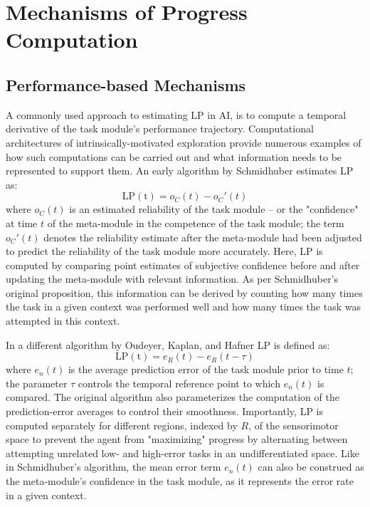 \section{Mechanisms of Progress Computation}

\subsection{Performance-based Mechanisms}\label{subsec:performance-based_mechanisms}

A commonly used approach to estimating \ac{LP} in \ac{AI}, is to compute a temporal derivative of the task module's performance trajectory. Computational architectures of intrinsically-motivated exploration provide numerous examples of how such computations can be carried out and what information needs to be represented to support them. An early algorithm by Schmidhuber \cite{schmidhuber_curious_1991} estimates \ac{LP} as:
\begin{equation}
    \mathrm{LP(t)} = o_C(t) - o_C'(t)
\end{equation}
where $o_C(t)$ is an estimated reliability of the task module -- or the "confidence" at time $t$ of the meta-module in the competence of the task module; the term $o_C'(t)$ denotes the reliability estimate after the meta-module had been adjusted to predict the reliability of the task module more accurately. Here, \ac{LP} is computed by comparing point estimates of subjective confidence before and after updating the meta-module with relevant information. As per Schmidhuber's original proposition, this information can be derived by counting how many times the task in a given context was performed well and how many times the task was attempted in this context.

In a different algorithm by Oudeyer, Kaplan, and Hafner \cite{oudeyer_intrinsic_2007} \ac{LP} is defined as:
\begin{equation}
    \mathrm{LP(t)} = e_R(t) - e_R(t-\tau)
\end{equation}
where $e_n(t)$ is the average prediction error of the task module prior to time $t$; the parameter $\tau$ controls the temporal reference point to which $e_n(t)$ is compared. The original algorithm also parameterizes the computation of the prediction-error averages to control their smoothness. Importantly, \ac{LP} is computed separately for different regions, indexed by $R$, of the sensorimotor space to prevent the agent from "maximizing" progress by alternating between attempting unrelated low- and high-error tasks in an undifferentiated space. Like in Schmidhuber's algorithm, the mean error term $e_n(t)$ can also be construed as the meta-module's confidence in the task module, as it represents the error rate in a given context. 

